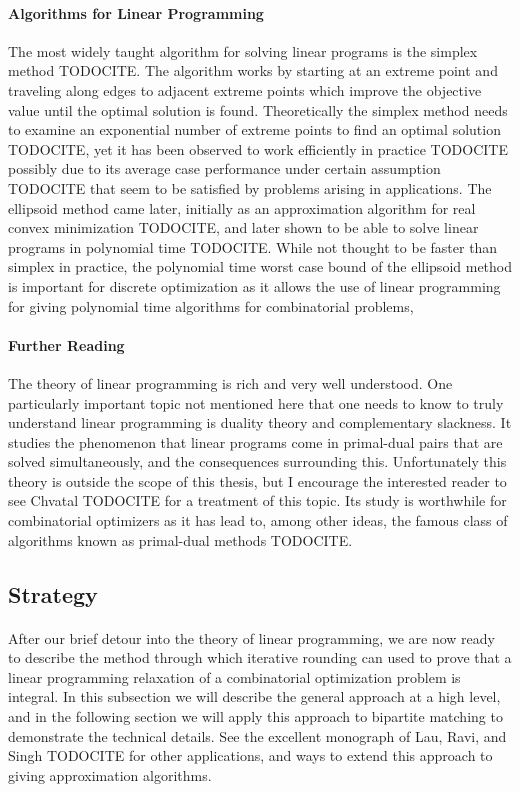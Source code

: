 \paragraph{Algorithms for Linear Programming}
The most widely taught algorithm for solving linear programs is the simplex method TODOCITE. The algorithm works by starting at an extreme point and traveling along edges to adjacent extreme points which improve the objective value until the optimal solution is found. Theoretically the simplex method needs to examine an exponential number of extreme points to find an optimal solution TODOCITE, yet it has been observed to work efficiently in practice TODOCITE possibly due to its average case performance under certain assumption TODOCITE that seem to be satisfied by problems arising in applications. The ellipsoid method came later, initially as an approximation algorithm for real convex minimization TODOCITE, and later shown to be able to solve linear programs in polynomial time TODOCITE. While not thought to be faster than simplex in practice, the polynomial time worst case bound of the ellipsoid method is important for discrete optimization as it allows the use of linear programming for giving polynomial time algorithms for combinatorial problems,
\paragraph{Further Reading}
The theory of linear programming is rich and very well understood. One particularly important topic not mentioned here that one needs to know to truly understand linear programming is duality theory and complementary slackness. It studies the phenomenon that linear programs come in primal-dual pairs that are solved simultaneously, and the consequences surrounding this. Unfortunately this theory is outside the scope of this thesis, but I encourage the interested reader to see Chvatal TODOCITE for a treatment of this topic. Its study is worthwhile for combinatorial optimizers as it has lead to, among other ideas, the famous class of algorithms known as primal-dual methods TODOCITE.
\subsection{Strategy}
\paragraph{}
After our brief detour into the theory of linear programming, we are now ready to describe the method through which iterative rounding can used to prove that a linear programming relaxation of a combinatorial optimization problem is integral. In this subsection we will describe the general approach at a high level, and in the following section we will apply this approach to bipartite matching to demonstrate the technical details. See the excellent monograph of Lau, Ravi, and Singh TODOCITE for other applications, and ways to extend this approach to giving approximation algorithms.
